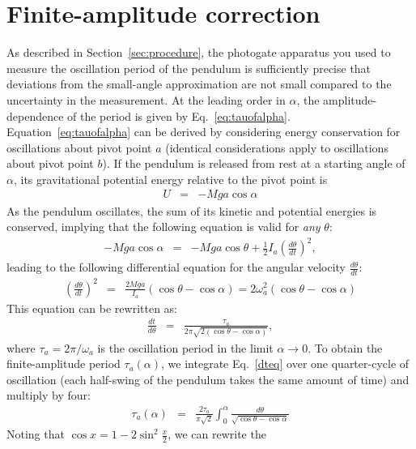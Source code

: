 \documentclass{revtex4}
\begin{document}
\appendix
\section{Finite-amplitude correction}
\label{appendixA}
As described in Section~\ref{sec:procedure}, the photogate apparatus you used to measure the
oscillation period of the pendulum is sufficiently precise that
deviations from the small-angle approximation are not small compared
to the uncertainty in the measurement. At the leading order in
$\alpha$, the amplitude-dependence of the period is given by
Eq.~\eqref{eq:tauofalpha}. Equation~\eqref{eq:tauofalpha} can be
derived by considering energy conservation for oscillations about pivot point $a$ (identical
considerations apply to oscillations about pivot point $b$). If the
pendulum is released from rest at a starting angle of $\alpha$, its
gravitational potential energy relative to the pivot point is
\begin{eqnarray}
  U &=& -M g a \cos \alpha
\end{eqnarray}
As the pendulum oscillates, the sum of its kinetic and potential
energies is conserved, implying that the following equation is valid
for \emph{any} $\theta$:
\begin{eqnarray}
  -M g a \cos \alpha &=& -M g a \cos \theta + \frac{1}{2} I_a
  \left(\frac{d\theta}{dt}\right)^2, 
\end{eqnarray}
leading to the following differential equation for the angular
velocity $\frac{d\theta}{dt}$:
\begin{eqnarray}
  \left(\frac{d\theta}{dt}\right)^2 &=& \frac{2Mga}{I_a}\left(\cos
    \theta - \cos \alpha \right) = 2\omega_a^2 \left(\cos
    \theta - \cos \alpha\right)
\end{eqnarray}
This equation can be rewritten as:
\begin{eqnarray}
  \frac{dt}{d\theta} &=& \frac{\tau_a}{2\pi \sqrt{2(\cos \theta - \cos \alpha)}} \label{dteq},
\end{eqnarray}
where $\tau_a = 2\pi/\omega_a$ is the oscillation period
in the limit $\alpha \rightarrow 0$. To obtain the finite-amplitude period $\tau_a(\alpha)$, we integrate
Eq.~\eqref{dteq} over one quarter-cycle of oscillation (each
half-swing of the pendulum takes the same amount of time) and multiply by
four:
\begin{eqnarray}
  \tau_a(\alpha) &=& \frac{2\tau_a}{\pi\sqrt{2}} \int_{0}^{\alpha}
  \frac{d\theta}{\sqrt{\cos \theta - \cos \alpha} }
\end{eqnarray} 
Noting that $\cos x = 1 - 2\sin^2 \frac{x}{2}$, we can rewrite the
\end{document}
